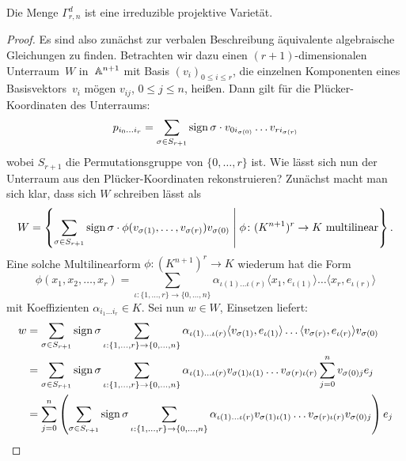 \begin{fact}
Die Menge $\Gamma_{r,n}^d$ ist eine irreduzible projektive Varietät.
\end{fact}
\begin{proof}
Es sind also zunächst zur verbalen Beschreibung äquivalente algebraische Gleichungen zu finden. Betrachten wir dazu einen $(r+1)$-dimensionalen Unterraum~$W$ in~$\mathbb A^{n+1}$ mit Basis $(v_i)_{0 \leq i \leq r}$, die einzelnen Komponenten eines Basisvektors~$v_i$ mögen $v_{ij}$, $0 \leq j \leq n$, heißen. Dann gilt für die Plücker-Koordinaten des Unterraums:
\begin{equation}
p_{i_0 \dots i_r} = \sum_{\sigma \in S_{r+1}} \operatorname{sign} \sigma \cdot v_{0i_{\sigma(0)}} \dots v_{ri_{\sigma(r)}}
\end{equation}
wobei $S_{r+1}$ die Permutationsgruppe von $\{0,\dots,r\}$ ist. Wie lässt sich nun der Unterraum aus den Plücker-Koordinaten rekonstruieren? Zunächst macht man sich klar, dass sich $W$ schreiben lässt als
\begin{equation}
W = \left\{ \sum\limits_{\sigma \in S_{r+1}} \operatorname{sign} \sigma \cdot \phi(v_{\sigma(1)}, \dots, v_{\sigma(r)}) v_{\sigma(0)} \;\middle|\; \phi \colon (K^{n+1})^r \rightarrow K \text{ multilinear} \right\}.
\end{equation}
Eine solche Multilinearform $\phi \colon (K^{n+1})^r \to K$ wiederum hat die Form
\begin{equation}
\phi(x_1, x_2, \dots, x_r) = \sum_{\iota: \{1, \dots, r\} \to \{0, \dots, n\}} \alpha_{\iota(1) \dots \iota(r)} \langle x_1, e_{\iota(1)} \rangle \dots \langle x_r, e_{\iota(r)} \rangle
\end{equation}
mit Koeffizienten $\alpha_{i_1 \dots i_r} \in K$. Sei nun $w \in W$, Einsetzen liefert:
\begin{align*}
w &= \sum\limits_{\sigma \in S_{r+1}} \sign \sigma \sum_{\iota: \{1, \dots, r\} \to \{0, \dots, n\}} \alpha_{\iota(1) \dots \iota(r)} \langle v_{\sigma(1)}, e_{\iota(1)} \rangle \dots \langle v_{\sigma(r)}, e_{\iota(r)} \rangle v_{\sigma(0)} \\
	&= \sum\limits_{\sigma \in S_{r+1}} \sign \sigma \sum_{\iota: \{1, \dots, r\} \to \{0, \dots, n\}} \alpha_{\iota(1) \dots \iota(r)} v_{\sigma(1)\iota(1)} \dots v_{\sigma(r)\iota(r)} \sum_{j=0}^n v_{\sigma(0)j} e_j \\
	&= \sum_{j=0}^n \left(\sum\limits_{\sigma \in S_{r+1}} \sign \sigma \sum_{\iota: \{1, \dots, r\} \to \{0, \dots, n\}} \alpha_{\iota(1) \dots \iota(r)} v_{\sigma(1)\iota(1)} \dots v_{\sigma(r)\iota(r)} v_{\sigma(0)j}\right) e_j \\

\end{align*}
\end{proof}
